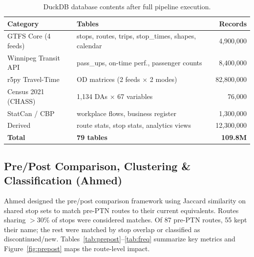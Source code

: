 \documentclass[11pt]{article}
\renewcommand{\arraystretch}{1.05}
\begin{document}
\begin{table}[H]
\centering
\footnotesize
\renewcommand{\arraystretch}{1.05}
\begin{tabular}{l l r}
\toprule
\textbf{Category} & \textbf{Tables} & \textbf{Records} \\
\midrule
GTFS Core (4 feeds) & stops, routes, trips, stop\_times, shapes, calendar & 4{,}900{,}000 \\
Winnipeg Transit API & pass\_ups, on-time perf., passenger counts & 8{,}400{,}000 \\
r5py Travel-Time & OD matrices (2 feeds $\times$ 2 modes) & 82{,}800{,}000 \\
Census 2021 (CHASS) & 1{,}134 DAs $\times$ 67 variables & 76{,}000 \\
StatCan / CBP & workplace flows, business register & 1{,}300{,}000 \\
Derived & route stats, stop stats, analytics views & 12{,}300{,}000 \\
\midrule
\textbf{Total} & \textbf{79 tables} & \textbf{109.8M} \\
\bottomrule
\end{tabular}
\caption{DuckDB database contents after full pipeline execution.}
\label{tab:database}
\end{table}

\subsection{Pre/Post Comparison, Clustering \& Classification (Ahmed)}

Ahmed designed the pre/post comparison framework using Jaccard similarity on shared stop sets to match pre-PTN routes to their current equivalents. Routes sharing $>$30\% of stops were considered matches. Of 87 pre-PTN routes, 55 kept their name; the rest were matched by stop overlap or classified as discontinued/new. Tables~\ref{tab:prepost}--\ref{tab:freq} summarize key metrics and Figure~\ref{fig:prepost} maps the route-level impact.
\end{document}
